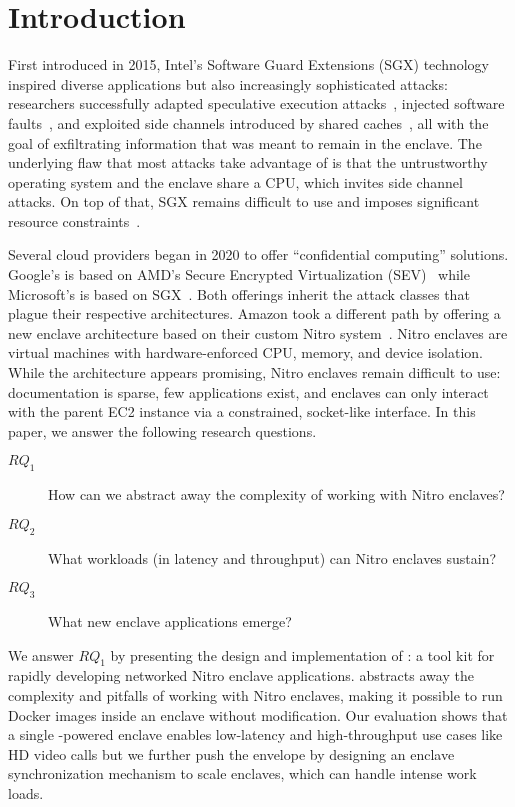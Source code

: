 \section{Introduction}

First introduced in 2015, Intel's Software Guard Extensions (SGX) technology
inspired diverse applications but also increasingly sophisticated attacks:
researchers successfully adapted speculative execution
attacks~\cite{VanBulck2018a}, injected software faults~\cite{Murdock2020a}, and
exploited side channels introduced by shared caches~\cite{Brasser2017a}, all
with the goal of exfiltrating information that was meant to remain in the
enclave.  The underlying flaw that most attacks take advantage of is that the
untrustworthy operating system and the enclave share a CPU, which invites side
channel attacks.  On top of that, SGX remains difficult to use and imposes
significant resource constraints~\cite{Ngoc2019a}.

Several cloud providers began in 2020 to offer ``confidential computing''
solutions.  Google's is based on AMD's Secure Encrypted Virtualization
(SEV)~\cite{googlecc} while Microsoft's is based on SGX~\cite{azurecc}.  Both
offerings inherit the attack classes that plague their respective architectures.
Amazon took a different path by offering a new enclave architecture based on
their custom Nitro system~\cite{nitro-enclaves}.  Nitro enclaves are
virtual machines with hardware-enforced CPU, memory, and device isolation.
%
While the architecture appears promising, Nitro enclaves remain difficult to
use: documentation is sparse, few applications exist, and enclaves can only
interact with the parent EC2 instance via a constrained, socket-like interface.
In this paper, we answer the following research questions.
\begin{description}
  \item[$RQ_1$] How can we abstract away the complexity of working with Nitro
    enclaves?
  \item[$RQ_2$] What workloads (in latency and throughput) can Nitro enclaves
    sustain?
  \item[$RQ_3$] What new enclave applications emerge?
\end{description}

We answer $RQ_1$ by presenting the design and implementation of \tool{}: a tool
kit for rapidly developing networked Nitro enclave applications.  \Tool{}
abstracts away the complexity and pitfalls of working with Nitro enclaves,
making it possible to run Docker images inside an enclave without modification.
Our evaluation shows that a single \tool{}-powered enclave enables low-latency
and high-throughput use cases like HD video calls but we further push the
envelope by designing an enclave synchronization mechanism to scale enclaves,
which can handle intense work loads.

